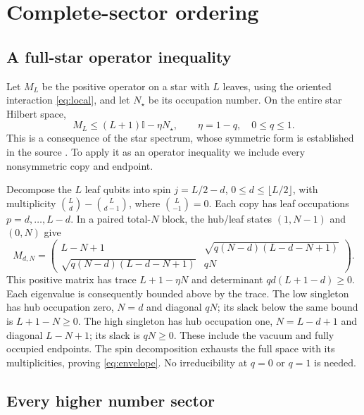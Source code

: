 \documentclass[11pt]{article}
\newcommand{\Id}{\mathbb I}
\begin{document}
\section{Complete-sector ordering}
\label{sec:ordering}

\subsection{A full-star operator inequality}

Let $M_L$ be the positive operator on a star with $L$ leaves, using
the oriented interaction \eqref{eq:local}, and let $N_\star$ be its
occupation number. On the entire star Hilbert space,
\begin{equation}
 M_L\leq(L+1)\Id-\eta N_\star,
 \qquad \eta=1-q,\quad0\leq q\leq1.
 \label{eq:envelope}
\end{equation}
This is a consequence of the star spectrum, whose symmetric form
is established in the source \cite{Wong2026}. To apply it as an
operator inequality we include every nonsymmetric copy and endpoint.

Decompose the $L$ leaf qubits into spin $j=L/2-d$,
$0\leq d\leq\lfloor L/2\rfloor$, with multiplicity
$\binom Ld-\binom L{d-1}$, where $\binom L{-1}=0$.
Each copy has leaf occupations $p=d,\ldots,L-d$. In a paired total-$N$
block, the hub/leaf states $(1,N-1)$ and $(0,N)$ give
\begin{equation}
 M_{d,N}=\begin{pmatrix}
 L-N+1 & \sqrt{q(N-d)(L-d-N+1)}\\
 \sqrt{q(N-d)(L-d-N+1)} & qN
 \end{pmatrix}.
 \label{eq:spinblock}
\end{equation}
This positive matrix has trace $L+1-\eta N$ and determinant
$qd(L+1-d)\geq0$. Each eigenvalue is consequently bounded above by
the trace. The low singleton has hub occupation zero, $N=d$ and
diagonal $qN$; its slack below the same bound is $L+1-N\geq0$.
The high singleton has hub occupation one, $N=L-d+1$ and diagonal
$L-N+1$; its slack is $qN\geq0$. These include the vacuum and
fully occupied endpoints. The spin decomposition exhausts the full
space with its multiplicities, proving \eqref{eq:envelope}.
No irreducibility at $q=0$ or $q=1$ is needed.

\subsection{Every higher number sector}
\end{document}
